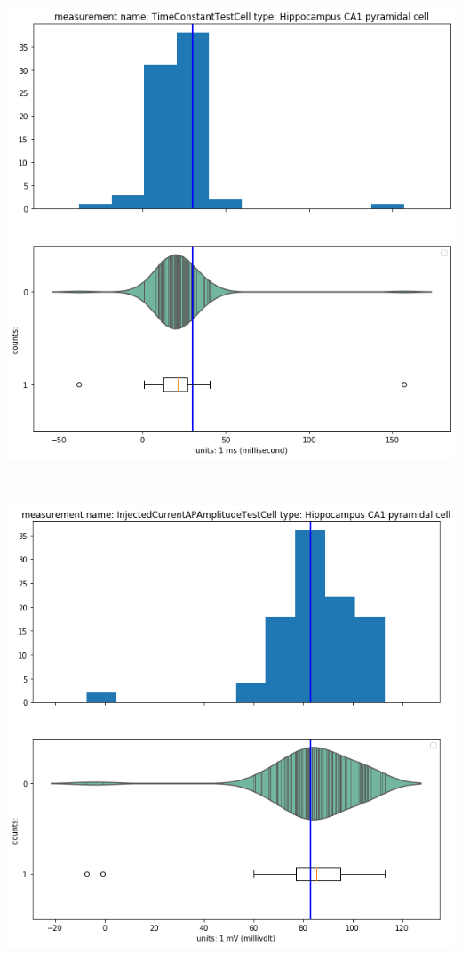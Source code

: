     
    \begin{center}
    \includegraphics[width=0.7\linewidth]{notebooks_converted/needata_thesis_files/needata_thesis_5_30}
    \end{center}
    { \hspace*{\fill} \\}
    
    \begin{center}
    \includegraphics[width=0.7\linewidth]{notebooks_converted/needata_thesis_files/needata_thesis_5_31}
    \end{center}
    { \hspace*{\fill} \\}
    
